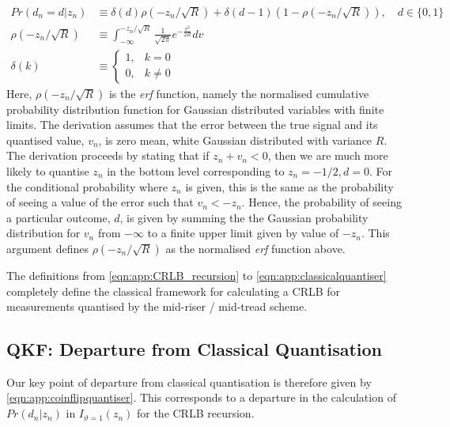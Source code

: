 \begin{align}
Pr(d_n=d| z_n) & \equiv \delta(d) \rho(-z_n/ \sqrt{R}) + \delta(d-1) (1- \rho(-z_n/ \sqrt{R})), \quad d \in \{0,1\} \label{eqn:app:classicalquantiser}\\
\rho(-z_n/ \sqrt{R}) & \equiv \int_{-\infty}^{-z_n/ \sqrt{R}} \frac{1}{\sqrt{2\pi}} e^{-\frac{v^2}{2 R}} dv \\
\delta(k) &\equiv \begin{cases} 1, &k=0 \\ 0, &k \neq 0 \end{cases}
\end{align}
Here, $\rho(-z_n/ \sqrt{R})$ is the \emph{erf} function, namely the normalised cumulative probability distribution function for Gaussian distributed variables with finite limits. The derivation assumes that the error  between the true signal and its quantised value, $v_n$, is zero mean, white Gaussian distributed with variance $R$. The derivation proceeds by stating that if $z_n + v_n < 0$, then we are much more likely to quantise $z_n$ in the bottom level corresponding to $z_n = -1/2, d= 0$. For the conditional probability where $z_n$ is given, this is the same as the probability of seeing a value of the error such that $v_n < -z_n$.  Hence, the probability of seeing a particular outcome, $d$, is given by summing the the Gaussian probability distribution for $v_n$ from $-\infty$ to a finite upper limit given by value of $-z_n$. This argument defines $\rho(-z_n/ \sqrt{R})$ as the normalised \emph{erf} function above.

The definitions from \cref{eqn:app:CRLB_recursion} to \cref{eqn:app:classicalquantiser} completely define the classical framework for calculating a CRLB for measurements quantised by the mid-riser / mid-tread scheme.

\subsection{QKF: Departure from Classical Quantisation}

Our key point of departure from classical quantisation is therefore given by \cref{eqn:app:coinflipquantiser}. This corresponds to a departure in the calculation of $Pr(d_n | z_n)$ in $I_{\vartheta=1}(z_n)$ for the CRLB recursion.

